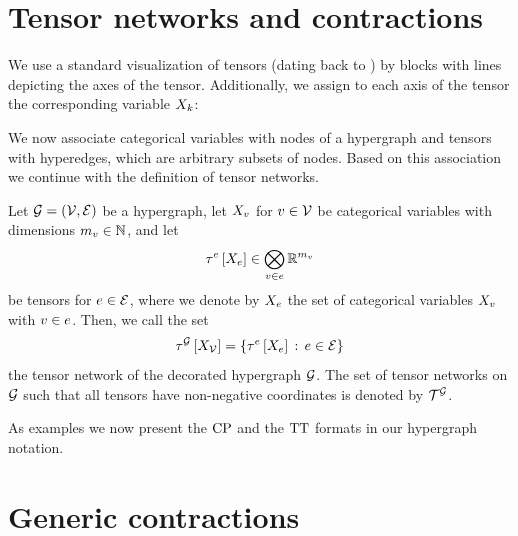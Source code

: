\section{Tensor networks and contractions}

We use a standard visualization of tensors (dating back to \cite{penrose_spinors_1987}) by blocks with lines depicting the axes of the tensor.
Additionally, we assign to each axis of the tensor the corresponding variable $X_{k}$:
\begin{center}
    
\end{center}
We now associate categorical variables with nodes of a hypergraph and tensors with hyperedges, which are arbitrary subsets of nodes.
Based on this association we continue with the definition of tensor networks.

\begin{definition}
    \label{def:tensorNetwork}
    Let $\mathcal{G}=(\mathcal{V},\mathcal{E})$ be a hypergraph, let $X_{v}$ for $v\in\mathcal{V}$ be categorical variables with dimensions $m_{v} \in \mathbb{N}$, and let
    \begin{align*}
        \tau^{e}\left[X_{e}\right] \in \bigotimes_{v\in e}\mathbb{R}^{m_{v}}
    \end{align*}
    be tensors for $e\in\mathcal{E}$, where we denote by $X_{e}$ the set of categorical variables $X_{v}$ with $v\in e$.
    Then, we call the set
    \begin{align*}
        \tau^{\mathcal{G}}\left[X_{\mathcal{V}}\right] = \{\tau^{e}\left[X_{e}\right]  \,:\, e\in\mathcal{E}\}
    \end{align*}
    the tensor network of the decorated hypergraph $\mathcal{G}$.
    The set of tensor networks on $\mathcal{G}$ such that all tensors have non-negative coordinates is denoted by $\mathcal{T}^{\mathcal{G}}$.
\end{definition}

As examples we now present the $\mathrm{CP}$ and the $\mathrm{TT}$ formats in our hypergraph notation.





\section{Generic contractions}

